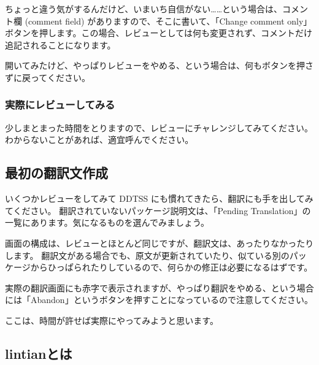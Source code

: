 \documentclass[mingoth,a4paper]{jsarticle}
\begin{document}
ちょっと違う気がするんだけど、いまいち自信がない……という場合は、コメント欄 (comment field) がありますので、そこに書いて、「Change comment only」ボタンを押します。この場合、レビューとしては何も変更されず、コメントだけ追記されることになります。

開いてみたけど、やっぱりレビューをやめる、という場合は、何もボタンを押さずに戻ってください。

\subsubsection{実際にレビューしてみる}

少しまとまった時間をとりますので、レビューにチャレンジしてみてください。
わからないことがあれば、適宜呼んでください。

\subsection{最初の翻訳文作成}

いくつかレビューをしてみて DDTSS にも慣れてきたら、翻訳にも手を出してみてください。
翻訳されていないパッケージ説明文は、「Pending Translation」の一覧にあります。気になるものを選んでみましょう。

画面の構成は、レビューとほとんど同じですが、翻訳文は、あったりなかったりします。
翻訳文がある場合でも、原文が更新されていたり、似ている別のパッケージからひっぱられたりしているので、何らかの修正は必要になるはずです。

実際の翻訳画面にも赤字で表示されますが、やっぱり翻訳をやめる、という場合には「Abandon」というボタンを押すことになっているので注意してください。

ここは、時間が許せば実際にやってみようと思います。


\subsection{lintianとは}
\end{document}
